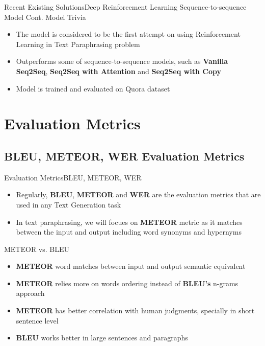 \documentclass[10pt]{beamer}
\begin{document}
\begin{frame}{Recent Existing Solutions}{Deep Reinforcement Learning Sequence-to-sequence Model Cont.}
Model Trivia
\begin{itemize}
	\item <1-> The model is considered to be the first attempt on using Reinforcement Learning in Text Paraphrasing problem
    \item <1-> Outperforms some of sequence-to-sequence models, such as \textbf{Vanilla Seq2Seq}, \textbf{Seq2Seq with Attention} and \textbf{Seq2Seq with Copy}
    \item <1-> Model is trained and evaluated on Quora dataset
\end{itemize}
\end{frame}

\section{Evaluation Metrics}
\subsection{BLEU, METEOR, WER Evaluation Metrics}
\begin{frame}{Evaluation Metrics}{BLEU, METEOR, WER}
\begin{itemize}
\item <1-> Regularly, \textbf{BLEU}, \textbf{METEOR} and \textbf{WER} are the evaluation metrics that are used in any Text Generation task
\item <1-> In text paraphrasing, we will focues on \textbf{METEOR} metric as it matches between the input and output including word synonyms and hypernyms 
\end{itemize}
METEOR vs. BLEU
\begin{itemize}
\item <1-> \textbf{METEOR} word matches between input and output semantic equivalent
\item <1-> \textbf{METEOR} relies more on words ordering instead of \textbf{BLEU's} n-grams approach
\item <1-> \textbf{METEOR} has better correlation with human judgments, specially in short sentence level
\item <1-> \textbf{BLEU} works better in large sentences and paragraphs
\end{itemize}
\end{frame}
\end{document}
